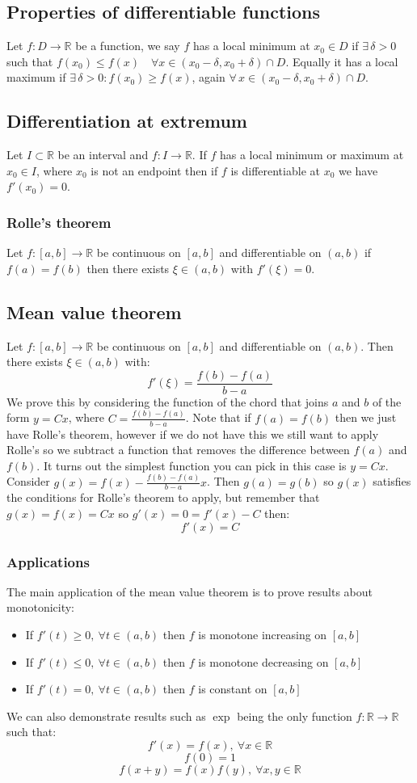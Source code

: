 \documentclass[12pt]{article}
\begin{document}
\subsection*{Properties of differentiable functions}
Let \(f:D\to\mathbb{R}\) be a function, we say \(f\) has a local minimum at \(x_0\in D\) if \(\exists\,\delta>0\) such that \(f(x_0)\leq f(x)\quad \forall x\in(x_0-\delta,x_0+\delta)\cap D\). Equally it has a local maximum if \(\exists\,\delta>0:f(x_0)\geq f(x)\), again \(\forall\,x\in(x_0-\delta,x_0+\delta)\cap D\).
\subsection*{Differentiation at extremum}
Let \(I\subset\mathbb{R}\) be an interval and \(f:I\to\mathbb{R}\). If \(f\) has a local minimum or maximum at \(x_0\in I\), where \(x_0\) is not an endpoint then if \(f\) is differentiable at \(x_0\) we have \(f'(x_0)=0\).
\subsubsection*{Rolle's theorem}
Let \(f:[a,b]\to\mathbb{R}\) be continuous on \([a,b]\) and differentiable on \((a,b)\) if \(f(a)=f(b)\) then there exists \(\xi\in(a,b)\) with \(f'(\xi)=0\).
\subsection*{Mean value theorem}
Let \(f:[a,b]\to\mathbb{R}\) be continuous on \([a,b]\) and differentiable on \((a,b)\). Then there exists \(\xi\in (a,b)\) with:
\[f'(\xi)=\frac{f(b)-f(a)}{b-a}\]
We prove this by considering the function of the chord that joins \(a\) and \(b\) of the form \(y=Cx\), where \(C=\frac{f(b)-f(a)}{b-a}\). Note that if \(f(a)=f(b)\) then we just have Rolle's theorem, however if we do not have this we still want to apply Rolle's so we subtract a function that removes the difference between \(f(a)\) and \(f(b)\). It turns out the simplest function you can pick in this case is \(y=Cx\). Consider \(g(x)=f(x)-\frac{f(b)-f(a)}{b-a}x\). Then \(g(a)=g(b)\) so \(g(x)\) satisfies the conditions for Rolle's theorem to apply, but remember that \(g(x)=f(x)=Cx\) so \(g'(x)=0=f'(x)-C\) then:
\[f'(x)=C\]
\subsubsection*{Applications}
The main application of the mean value theorem is to prove results about monotonicity:
\begin{itemize}
    \item If \(f'(t)\geq0,\ \forall t\in (a,b)\) then \(f\) is monotone increasing on \([a,b]\)
    \item If \(f'(t)\leq 0,\ \forall t\in (a,b)\) then \(f\) is monotone decreasing on \([a,b]\)
    \item If \(f'(t)=0,\ \forall t\in (a,b)\) then \(f\) is constant on \([a,b]\)
\end{itemize}
We can also demonstrate results such as \(\exp\) being the only function \(f:\mathbb{R}\to\mathbb{R}\) such that:
\[f'(x)=f(x),\ \forall x\in\mathbb{R}\]
\[f(0)=1\]
\[f(x+y)=f(x)f(y),\ \forall x,y\in\mathbb{R}\]
\end{document}
